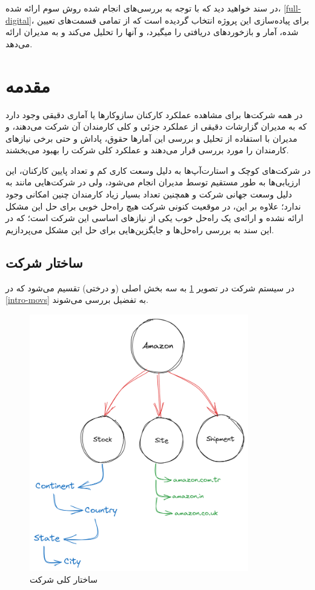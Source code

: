 \documentclass[12pt, dvipsnames, svgnames, x11names,]{article}
\begin{document}
در سند خواهید دید که با توجه به بررسی‌های انجام شده روش سوم ارائه شده، \ref{full-digital}، برای پیاده‌سازی این پروژه انتخاب گردیده است که از تمامی قسمت‌های تعیین شده، آمار و بازخورد‌های دریافتی را میگیرد، و آنها را تحلیل می‌کند و به مدیران ارائه می‌دهد.

\section{مقدمه}
در همه شرکت‌ها برای مشاهده عملکرد کارکنان سازوکارها یا آماری دقیقی وجود دارد که به مدیران گزارشات دقیقی از عملکرد جزئی و کلی کارمندان آن شرکت می‌دهند،‌ و مدیران با استفاده از تحلیل و بررسی این آمار‌ها حقوق، پاداش و حتی برخی نیازهای کارمندان را مورد بررسی قرار می‌دهند و عملکرد کلی شرکت را بهبود می‌بخشند. 

در شرکت‌های کوچک و استارت‌آپ‌ها به دلیل وسعت کاری کم و تعداد پایین کارکنان، این ارزیابی‌ها به طور مستقیم توسط مدیران انجام می‌شود، ولی در شرکت‌هایی مانند  به دلیل وسعت جهانی شرکت و همچنین تعداد بسیار زیاد کارمندان چنین امکانی وجود ندارد؛ علاوه بر این، در موقعیت کنونی شرکت  هیچ راه‌حل خوبی برای حل این مشکل ارائه نشده و ارائه‌ی یک راه‌حل خوب یکی از نیاز‌های اساسی این شرکت است؛ که در این سند به بررسی راه‌حل‌ها  و جایگزین‌هایی برای حل این مشکل می‌پردازیم.
\subsection{ساختار شرکت}\label{amz-struct}
در سیستم  شرکت  در تصویر \ref{amz-s3} به سه بخش اصلی (و درختی) تقسیم می‌شود که در \ref{intro-movs} به تفضیل بررسی می‌شوند.
\begin{figure}[b]
\begin{center}
    \includegraphics[width=0.85\textwidth, height=0.75\textheight]{../images/amazon-s3-comp(2)}
\end{center} 
\caption{ساختار کلی شرکت }\label{amz-s3}
\end{figure}
\end{document}
